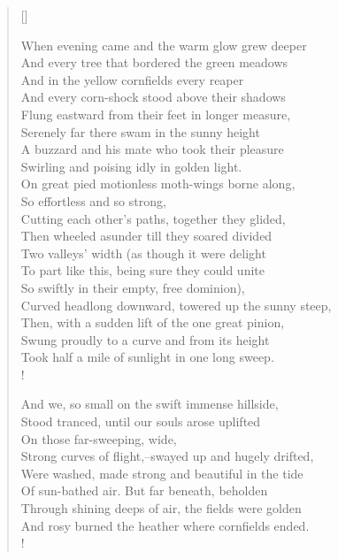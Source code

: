 \documentclass[11pt, a4paper]{article} %
\begin{document}
\settowidth{\versewidth}{A buzzard and his mate who took their pleasure} %
\begin{verse}[\versewidth]


When evening came and the warm glow grew deeper \\
And every tree that bordered the green meadows \\
And in the yellow cornfields every reaper \\
And every corn-shock stood above their shadows \\
Flung eastward from their feet in longer measure, \\
Serenely far there swam in the sunny height \\
A buzzard and his mate who took their pleasure \\
Swirling and poising idly in golden light. \\
On great pied motionless moth-wings borne along, \\
\vin\vin So effortless and so strong, \\ %
Cutting each other's paths, together they glided, \\
Then wheeled asunder till they soared divided \\
Two valleys' width (as though it were delight \\
To part like this, being sure they could unite \\
So swiftly in their empty, free dominion), \\
Curved headlong downward, towered up the sunny steep, \\
Then, with a sudden lift of the one great pinion, \\
Swung proudly to a curve and from its height \\
Took half a mile of sunlight in one long sweep. \\!


And we, so small on the swift immense hillside, \\
Stood tranced, until our souls arose uplifted \\
\vin\vin On those far-sweeping, wide, \\ %
Strong curves of flight,--swayed up and hugely drifted, \\
Were washed, made strong and beautiful in the tide \\
Of sun-bathed air. But far beneath, beholden \\
Through shining deeps of air, the fields were golden \\
And rosy burned the heather where cornfields ended. \\!


\end{verse}
\end{document}
